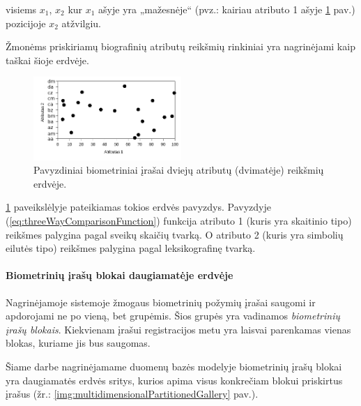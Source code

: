 visiems $x_1$, $x_2$ kur $x_1$ ašyje yra „mažesnėje“ (pvz.: kairiau atributo 1 ašyje \ref{img:multidimensionalGallery} pav.) pozicijoje $x_2$ atžvilgiu.

Žmonėms priskiriamų biografinių atributų reikšmių rinkiniai yra nagrinėjami kaip taškai šioje erdvėje.

\begin{figure}[H]
\begin{center}
\includegraphics[width=0.5\textwidth]{img/MultidimensionalGallery.png}
\caption{Pavyzdiniai biometriniai įrašai dviejų atributų (dvimatėje) reikšmių erdvėje.}
\label{img:multidimensionalGallery}
\end{center}
\end{figure}

\ref{img:multidimensionalGallery} paveikslėlyje pateikiamas tokios erdvės pavyzdys.
Pavyzdyje (\ref{eq:threeWayComparisonFunction}) funkcija atributo 1 (kuris yra skaitinio tipo) reikšmes palygina pagal sveikų skaičių tvarką.
O atributo 2 (kuris yra simbolių eilutės tipo) reikšmes palygina pagal leksikografinę tvarką.




\paragraph{Biometrinių įrašų blokai daugiamatėje erdvėje}

Nagrinėjamoje sistemoje \cite{NeurotechnologyMegamatcherAccelerator} žmogaus biometrinių požymių įrašai saugomi ir apdorojami ne po vieną, bet grupėmis.
Šios grupės yra vadinamos {\it biometrinių įrašų blokais}.
Kiekvienam įrašui registracijos metu yra laisvai parenkamas vienas blokas, kuriame jis bus saugomas.

Šiame darbe nagrinėjamame duomenų bazės modelyje biometrinių įrašų blokai yra daugiamatės erdvės sritys, kurios apima visus konkrečiam blokui priskirtus įrašus (žr.: \ref{img:multidimensionalPartitionedGallery} pav.).

